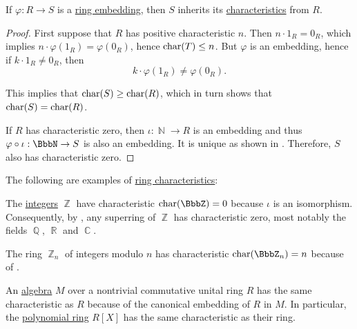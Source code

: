 \begin{proposition}\label{thm:ring_embedding_preserves_characteristic}
  If \( \varphi: R \to S \) is a \hyperref[def:ring/homomorphism]{ring embedding}, then \( S \) inherits its \hyperref[def:ring_characteristic]{characteristics} from \( R \).
\end{proposition}
\begin{proof}
  First suppose that \( R \) has positive characteristic \( n \). Then \( n \cdot 1_R = 0_R \), which implies \( n \cdot \varphi(1_R) = \varphi(0_R) \), hence \( \operatorname{char}(T) \leq n \). But \( \varphi \) is an embedding, hence if \( k \cdot 1_R \neq 0_R \), then
  \begin{equation*}
    k \cdot \varphi(1_R) \neq \varphi(0_R).
  \end{equation*}

  This implies that \( \operatorname{char}(S) \geq \operatorname{char}(R) \), which in turn shows that \( \operatorname{char}(S) = \operatorname{char}(R) \).

  If \( R \) has characteristic zero, then \( \iota: \BbbN \to R \) is an embedding and thus \( \varphi \bincirc \iota: \BbbN \to S \) is also an embedding. It is unique as shown in . Therefore, \( S \) also has characteristic zero.
\end{proof}

\begin{example}\label{ex:def:ring_characteristic}
  The following are examples of \hyperref[def:ring_characteristic]{ring characteristics}:
  \begin{thmenum}
     The \hyperref[def:integers]{integers} \( \BbbZ \) have characteristic \( \op{char}(\BbbZ) = 0 \) because \( \iota \) is an isomorphism. Consequently, by , any superring of \( \BbbZ \) has characteristic zero, most notably the fields \( \BbbQ \), \( \BbbR \) and \( \BbbC \).

     The ring \hyperref[thm:ring_of_integers_modulo]{\( \BbbZ_n \)} of integers modulo \( n \) has characteristic \( \op{char}(\BbbZ_n) = n \) because of .

     An \hyperref[def:algebra_over_semiring]{algebra} \( M \) over a nontrivial commutative unital ring \( R \) has the same characteristic as \( R \) because of the canonical embedding of \( R \) in \( M \). In particular, the \hyperref[def:polynomial_algebra]{polynomial ring} \( R[X] \) has the same characteristic as their ring.
  \end{thmenum}
\end{example}

